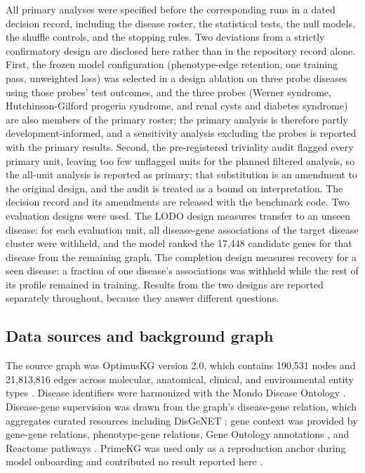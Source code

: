 \documentclass[11pt]{article}
\begin{document}
All primary analyses were specified before the corresponding runs in a dated decision record, including the disease roster, the statistical tests, the null models, the shuffle controls, and the stopping rules. Two deviations from a strictly confirmatory design are disclosed here rather than in the repository record alone. First, the frozen model configuration (phenotype-edge retention, one training pass, unweighted loss) was selected in a design ablation on three probe diseases using those probes' test outcomes, and the three probes (Werner syndrome, Hutchinson-Gilford progeria syndrome, and renal cysts and diabetes syndrome) are also members of the primary roster; the primary analysis is therefore partly development-informed, and a sensitivity analysis excluding the probes is reported with the primary results. Second, the pre-registered triviality audit flagged every primary unit, leaving too few unflagged units for the planned filtered analysis, so the all-unit analysis is reported as primary; that substitution is an amendment to the original design, and the audit is treated as a bound on interpretation. The decision record and its amendments are released with the benchmark code. Two evaluation designs were used. The LODO design measures transfer to an unseen disease: for each evaluation unit, all disease-gene associations of the target disease cluster were withheld, and the model ranked the 17,448 candidate genes for that disease from the remaining graph. The completion design measures recovery for a seen disease: a fraction of one disease's associations was withheld while the rest of its profile remained in training. Results from the two designs are reported separately throughout, because they answer different questions.

\subsection{Data sources and background graph}

The source graph was OptimusKG version 2.0, which contains 190,531 nodes and 21,813,816 edges across molecular, anatomical, clinical, and environmental entity types \cite{vittor2026}. Disease identifiers were harmonized with the Mondo Disease Ontology \cite{vasilevsky2022}. Disease-gene supervision was drawn from the graph's disease-gene relation, which aggregates curated resources including DisGeNET \cite{pineiro2020}; gene context was provided by gene-gene relations, phenotype-gene relations, Gene Ontology annotations \cite{ashburner2000}, and Reactome pathways \cite{jassal2020}. PrimeKG was used only as a reproduction anchor during model onboarding and contributed no result reported here \cite{chandak2023}.
\end{document}
